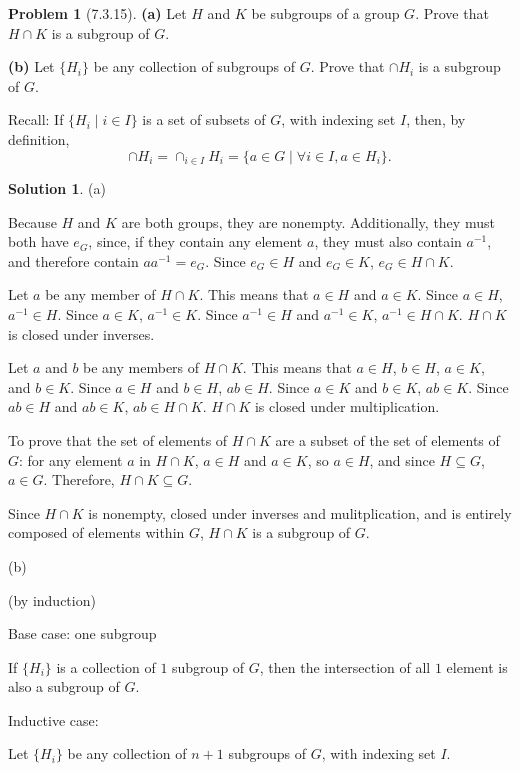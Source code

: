 \documentclass[12pt]{article}
\theoremstyle{definition}
\newtheorem*{prob}{Problem}
\newtheorem*{soln}{Solution}
\begin{document}
\begin{prob}[7.3.15] \text{ }
\textbf{(a)}   Let $H$ and $K$ be subgroups of a group $G$. 
Prove that $H \cap K$ is a subgroup of  $G$.  

\textbf{(b)}   Let $\{H_i\}$ be any collection of  subgroups of  $G$. 
Prove that $\cap H_i$ is a subgroup of  $G$.

Recall: If $\{ H_i \mid i \in I \}$ is a set of subsets of $G$, with indexing set $I$,
then, by definition, 
\[
\cap H_i = \cap_{i \in I} H_i = \{ a \in G \mid \forall i \in I, a \in H_i \}.
\]
\end{prob}

\begin{soln}\quad

(a)

Because $H$ and $K$ are both groups, they are nonempty.
Additionally, they must both have $e_G$, since,
if they contain any element $a$, they must also contain $a^{-1}$,
and therefore contain $aa^{-1}=e_G$.
Since $e_G\in H$ and $e_G\in K$, $e_G\in H\cap K$.

Let $a$ be any member of $H\cap K$.
This means that $a\in H$ and $a\in K$.
Since $a\in H$, $a^{-1}\in H$.
Since $a\in K$, $a^{-1}\in K$.
Since $a^{-1}\in H$ and $a^{-1}\in K$, $a^{-1}\in H\cap K$.
$H\cap K$ is closed under inverses.

Let $a$ and $b$ be any members of $H\cap K$.
This means that $a\in H$, $b\in H$, $a\in K$, and $b\in K$.
Since $a\in H$ and $b\in H$, $ab\in H$.
Since $a\in K$ and $b\in K$, $ab\in K$.
Since $ab\in H$ and $ab\in K$, $ab\in H\cap K$.
$H\cap K$ is closed under multiplication.

To prove that the set of elements of $H\cap K$
are a subset of the set of elements of $G$:
for any element $a$ in $H\cap K$, $a\in H$ and $a\in K$,
so $a\in H$, and since $H\subseteq G$, $a\in G$.
Therefore, $H\cap K\subseteq G$.

Since $H\cap K$ is nonempty,
closed under inverses and mulitplication,
and is entirely composed of elements within $G$,
$H\cap K$ is a subgroup of $G$.

(b)

(by induction)

Base case: one subgroup

If $\{H_i\}$ is a collection of $1$ subgroup of $G$,
then the intersection of all $1$ element is also a subgroup of $G$.

Inductive case:

Let $\{H_i\}$ be any collection of $n+1$ subgroups of $G$,
with indexing set $I$.


\end{soln}
\end{document}
